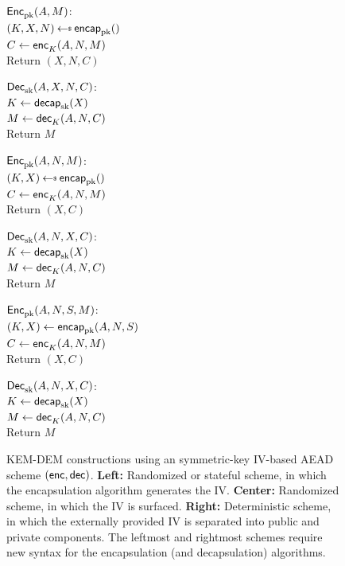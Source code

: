 \begin{figure}
\begin{center}
{
\underline{${\mathsf{Enc}}_{\mathrm{pk}}^{}(A, M)$}:\\[2pt]
$(K,X,\pubiv) \getsr \encap_\pk()$\\
$C \gets {\mathsf{enc}}_{K}^{}(A,N,M)$\\
Return $(X,N,C)$

\medskip
\underline{${\mathsf{Dec}}_{\mathrm{sk}}^{}(A,X,N,C)$}:\\[2pt]
$K \gets \mathsf{decap}_{\mathrm{sk}}(X)$\\
$M \gets {\mathsf{dec}}_{K}^{}(A,N,C)$\\
Return $M$
}
{
\underline{${\mathsf{Enc}}_{\mathrm{pk}}^{}(A,N,M)$}:\\[2pt]
$(K,X) \getsr \encap_\pk()$\\
$C \gets {\mathsf{enc}}_{K}^{}(A,N,M)$\\
Return $(X,C)$

\medskip
\underline{${\mathsf{Dec}}_{\mathrm{sk}}^{}(A,N,X,C)$}:\\[2pt]
$K \gets \mathsf{decap}_{\mathrm{sk}}(X)$\\
$M \gets {\mathsf{dec}}_{K}^{}(A,N,C)$\\
Return $M$

}
{
\underline{${\mathsf{Enc}}_{\mathrm{pk}}^{}(A,N,S,M)$}:\\[2pt]
$(K,X) \gets \mathsf{encap}_{\mathrm{pk}}(A,N,S)$\\
$C \gets {\mathsf{enc}}_{K}^{}(A,N,M)$\\
Return $(X,C)$

\medskip
\underline{${\mathsf{Dec}}_{\mathrm{sk}}^{}(A,N,X,C)$}:\\[2pt]
$K \gets \mathsf{decap}_{\mathrm{sk}}(X)$\\
$M \gets {\mathsf{dec}}_{K}^{}(A,N,C)$\\
Return $M$
}
\caption{KEM-DEM constructions using an symmetric-key IV-based AEAD scheme $({\mathsf{enc}},{\mathsf{dec}})$. \textbf{Left:} Randomized or stateful scheme, in which the encapsulation algorithm generates the IV.  \textbf{Center:} Randomized scheme, in which the IV is surfaced.  \textbf{Right:} Deterministic scheme, in which the externally provided IV is separated into public and private components. The leftmost and rightmost schemes require new syntax for the encapsulation (and decapsulation) algorithms.}
\label{fig:kem-dem options}
\end{center}
\end{figure}


